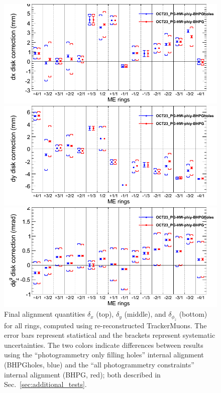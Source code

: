 \documentclass[12pt]{article}
\begin{document}
\begin{figure}
\begin{center}
\includegraphics[width=0.85\linewidth]{finalholes1.png}

\includegraphics[width=0.85\linewidth]{finalholes2.png}

\includegraphics[width=0.85\linewidth]{finalholes3.png}
\end{center}

\caption{Final alignment quantities $\delta_x$ (top), $\delta_y$
  (middle), and $\delta_{\phi_z}$ (bottom) for all rings, computed
  using re-reconstructed TrackerMuons.  The error bars represent
  statistical and the brackets represent systematic uncertainties.
  The two colors indicate differences between results using the
  ``photogrammetry only filling holes'' internal alignment (BHPGholes,
  blue) and the ``all photogrammetry constraints'' internal alignment
  (BHPG, red); both described in
  Sec.~\ref{sec:additional_tests}. \label{fig:finalholes}}
\end{figure}
\end{document}
